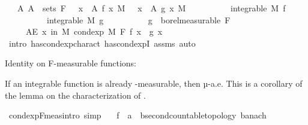 \begin{isabellebody}
\ \ \ {\isachardoublequoteopen}{\isasymAnd}A{\isachardot}{\kern0pt}\ A\ {\isasymin}\ sets\ F\ {\isasymLongrightarrow}\ {\isacharparenleft}{\kern0pt}{\isasymintegral}\ x\ {\isasymin}\ A{\isachardot}{\kern0pt}\ f\ x\ {\isasympartial}M{\isacharparenright}{\kern0pt}\ {\isacharequal}{\kern0pt}\ {\isacharparenleft}{\kern0pt}{\isasymintegral}\ x\ {\isasymin}\ A{\isachardot}{\kern0pt}\ g\ x\ {\isasympartial}M{\isacharparenright}{\kern0pt}{\isachardoublequoteclose}\isanewline
\ \ \ \ \ \ \ \ \ \ {\isachardoublequoteopen}integrable\ M\ f{\isachardoublequoteclose}\isanewline
\ \ \ \ \ \ \ \ \ \ {\isachardoublequoteopen}integrable\ M\ g{\isachardoublequoteclose}\isanewline
\ \ \ \ \ \ \ \ \ \ {\isachardoublequoteopen}g\ {\isasymin}\ borel{\isacharunderscore}{\kern0pt}measurable\ F{\isachardoublequoteclose}\isanewline
\ \ \ \ \ {\isachardoublequoteopen}AE\ x\ in\ M{\isachardot}{\kern0pt}\ cond{\isacharunderscore}{\kern0pt}exp\ M\ F\ f\ x\ {\isacharequal}{\kern0pt}\ g\ x{\isachardoublequoteclose}\isanewline
%
\isadelimproof
\ \ %
\endisadelimproof
%
\isatagproof
{}\isamarkupfalse%
\ {\isacharparenleft}{\kern0pt}intro\ has{\isacharunderscore}{\kern0pt}cond{\isacharunderscore}{\kern0pt}exp{\isacharunderscore}{\kern0pt}charact\ has{\isacharunderscore}{\kern0pt}cond{\isacharunderscore}{\kern0pt}expI{\isacharprime}{\kern0pt}\ assms{\isacharparenright}{\kern0pt}\ auto%
\endisatagproof
{\isafoldproof}%
%
\isadelimproof
%
\endisadelimproof
%
\begin{isamarkuptext}%
Identity on F-measurable functions:%
\end{isamarkuptext}\isamarkuptrue%
%
\begin{isamarkuptext}%
If an integrable function  is already -measurable, then  µ-a.e.
      This is a corollary of the lemma on the characterization of .%
\end{isamarkuptext}\isamarkuptrue%
\isamarkupfalse%
\ cond{\isacharunderscore}{\kern0pt}exp{\isacharunderscore}{\kern0pt}F{\isacharunderscore}{\kern0pt}meas{\isacharbrackleft}{\kern0pt}intro{\isacharcomma}{\kern0pt}\ simp{\isacharbrackright}{\kern0pt}{\isacharcolon}{\kern0pt}\isanewline
\ \ \ f\ {\isacharcolon}{\kern0pt}{\isacharcolon}{\kern0pt}\ {\isachardoublequoteopen}{\isacharprime}{\kern0pt}a\ {\isasymRightarrow}\ {\isacharprime}{\kern0pt}b{\isacharcolon}{\kern0pt}{\isacharcolon}{\kern0pt}{\isacharbraceleft}{\kern0pt}second{\isacharunderscore}{\kern0pt}countable{\isacharunderscore}{\kern0pt}topology{\isacharcomma}{\kern0pt}\ banach{\isacharbraceright}{\kern0pt}{\isachardoublequoteclose}\isanewline

\end{isabellebody}
